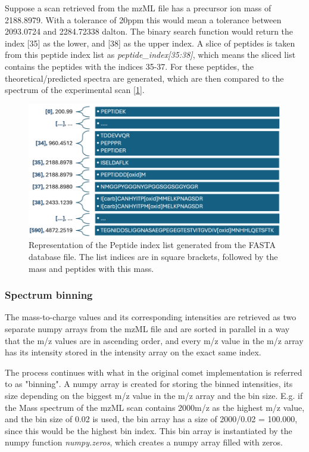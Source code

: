 \documentclass[11pt]{article}
\begin{document}
Suppose a scan retrieved from the mzML file has a precursor ion mass of 2188.8979. With a tolerance of 20ppm this would mean a tolerance between 2093.0724 and 2284.72338 dalton. The binary search function would return the index [35] as the lower, and [38] as the upper index. A slice of peptides is taken  from this peptide index list as \textit{peptide\_index[35:38]}, which means the sliced list contains the peptides with the indices 35-37. For these peptides, the theoretical/predicted spectra are generated, which are then compared to the spectrum of the experimental scan [\cref{fig:peptindex}].

\begin{figure}[ht]
\centering
\includegraphics[width=1\textwidth]{figs/pepindex.png}
\caption{Representation of the Peptide index list generated from the FASTA database file. The list indices are in square brackets, followed by the mass and peptides with this mass.}
\label{fig:peptindex}
\end{figure}

\subsubsection{Spectrum binning}
The mass-to-charge values and its corresponding intensities are retrieved as two separate numpy arrays from the mzML file and are sorted in parallel in a way that the m/z values are in ascending order, and every m/z value in the m/z array has its intensity stored in the intensity array on the exact same index.

The process continues with what in the original comet implementation is referred to as "binning". A numpy array is created for storing the binned intensities, its size depending on the biggest m/z value in the m/z array and the bin size. E.g. if the Mass spectrum of the mzML scan contains 2000m/z as the highest m/z value, and the bin size of 0.02 is used, the bin array has a size of 2000/0.02 = 100.000, since this would be the highest bin index. This bin array is instantiated by the numpy function \textit{numpy.zeros}, which creates a numpy array filled with zeros.
\end{document}
